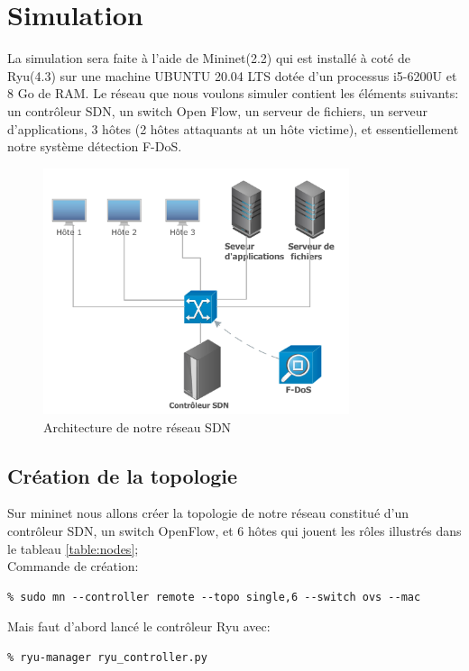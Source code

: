 \newpage
\section{Simulation}
La simulation sera faite à l'aide de Mininet(2.2) qui est installé à coté de Ryu(4.3) sur une machine UBUNTU 20.04 LTS dotée d'un processus i5-6200U et 8 Go de RAM. Le réseau que nous voulons simuler contient les éléments suivants: un contrôleur SDN, un switch Open Flow, un serveur de fichiers, un serveur d'applications, 3 hôtes (2 hôtes attaquants at un hôte victime), et essentiellement notre système détection F-DoS.
\begin{figure}[h]
\centering
\includegraphics[width=0.8\textwidth]{Figures/simulation}
\decoRule
\caption{Architecture de notre réseau SDN}
\label{fig:architecture}
\end{figure} 

\subsection{Création de la topologie}
Sur mininet nous allons créer la topologie de notre réseau constitué d'un contrôleur SDN, un switch OpenFlow, et 6 hôtes qui jouent les rôles illustrés dans le tableau \ref{table:nodes};\\

\noindent Commande de création:
\begin{verbatim}
% sudo mn --controller remote --topo single,6 --switch ovs --mac
\end{verbatim}
Mais faut d'abord lancé le contrôleur Ryu avec:
\begin{verbatim}
% ryu-manager ryu_controller.py 
\end{verbatim}

